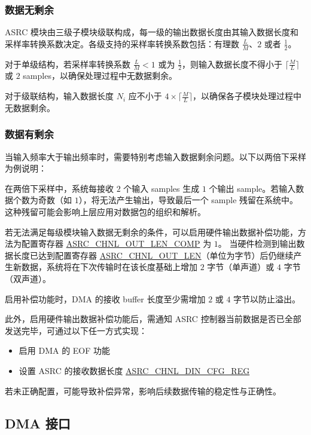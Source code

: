 \documentclass[main\_\_CN.tex]{subfiles}
\begin{document}
\subsubsection{数据无剩余}

ASRC 模块由三级子模块级联构成，每一级的输出数据长度由其输入数据长度和采样率转换系数决定。各级支持的采样率转换系数包括：有理数 $\frac{L}{M}$、$2$ 或者 $\frac{1}{2}$。

对于单级结构，若采样率转换系数 $\frac{L}{M} < 1$ 或为 $\frac{1}{2}$，则输入数据长度不得小于 $\lceil \frac{M}{L} \rceil$ 或 $2$ samples，以确保处理过程中无数据剩余。

对于级联结构，输入数据长度 $N_i$ 应不小于 $4 \times \lceil \frac{M}{L} \rceil$，以确保各子模块处理过程中无数据剩余。

\subsubsection{数据有剩余}

当输入频率大于输出频率时，需要特别考虑输入数据剩余问题。以下以两倍下采样为例说明：

在两倍下采样中，系统每接收 $2$ 个输入 samples 生成 $1$ 个输出 sample。若输入数据个数为奇数（如 $1$），将无法产生输出，导致最后一个 sample 残留在系统中。这种残留可能会影响上层应用对数据包的组织和解析。

若无法满足每级模块输入数据无剩余的条件，可以启用硬件输出数据补偿功能，方法为配置寄存器 \hyperref[fielddesc:ASRCCHNL0OUTLENCOMP]{ASRC\_CHNL\_OUT\_LEN\_COMP} 为 $1$。
当硬件检测到输出数据长度已达到配置寄存器 \hyperref[fielddesc:ASRCCHNL0OUTLEN]{ASRC\_CHNL\_OUT\_LEN}（单位为字节）后仍继续产生新数据，系统将在下次传输时在该长度基础上增加 $2$ 字节（单声道）或 $4$ 字节（双声道）。

启用补偿功能时，DMA 的接收 buffer 长度至少需增加 $2$ 或 $4$ 字节以防止溢出。

此外，启用硬件输出数据补偿功能后，需通知 ASRC 控制器当前数据是否已全部发送完毕，可通过以下任一方式实现：

\begin{itemize}
    \item 启用 DMA 的 EOF 功能
    \item 设置 ASRC 的接收数据长度 \hyperref[regdesc:ASRCCHNL0DINCFGREG]{ASRC\_CHNL\_DIN\_CFG\_REG}
\end{itemize}

若未正确配置，可能导致补偿异常，影响后续数据传输的稳定性与正确性。

\subsection{DMA 接口}
\end{document}
